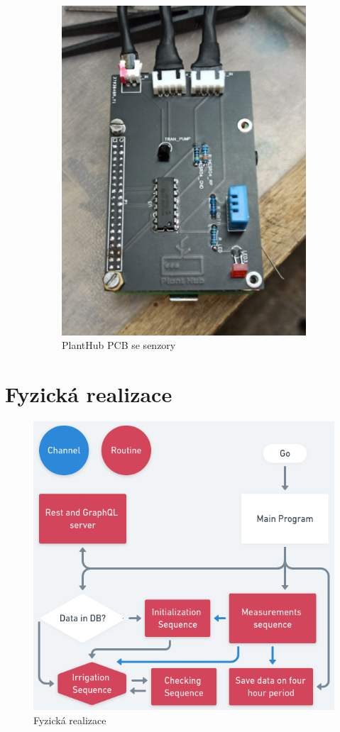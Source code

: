 \documentclass[12pt,a4paper]{article}
\begin{document}
\begin{figure}[h]
\begin{subfigure}[b]{0.4\linewidth}
		\includegraphics[width=\linewidth]{planthub.png}
		\caption{PlantHub \ac{PCB} se senzory}
	\end{subfigure}
	\caption{}
\end{figure}

\clearpage

\section{Fyzická realizace}


\begin{figure}[h]
	\centering
	\includegraphics[width=0.72\linewidth]{go.png}
	\caption{Fyzická realizace}
\end{figure}
\end{document}
